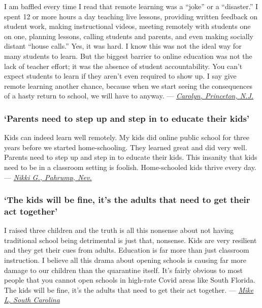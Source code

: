 I am baffled every time I read that remote learning was a ``joke'' or a
``disaster.'' I spent 12 or more hours a day teaching live lessons,
providing written feedback on student work, making instructional videos,
meeting remotely with students one on one, planning lessons, calling
students and parents, and even making socially distant ``house calls.''
Yes, it was hard. I know this was not the ideal way for many students to
learn. But the biggest barrier to online education was not the lack of
teacher effort; it was the absence of student accountability. You can't
expect students to learn if they aren't even required to show up. I say
give remote learning another chance, because when we start seeing the
consequences of a hasty return to school, we will have to anyway. ---
\href{https://nyti.ms/2DLfVjo\#permid=108078115}{\emph{Carolyn,
Princeton, N.J.}}

\hypertarget{parents-need-to-step-up-and-step-in-to-educate-their-kids}{%
\subsubsection{\texorpdfstring{\textbf{`Parents need to step up and step
in to educate their
kids'}}{`Parents need to step up and step in to educate their kids'}}\label{parents-need-to-step-up-and-step-in-to-educate-their-kids}}

Kids can indeed learn well remotely. My kids did online public school
for three years before we started home-schooling. They learned great and
did very well. Parents need to step up and step in to educate their
kids. This insanity that kids need to be in a classroom setting is
foolish. Home-schooled kids thrive every day. ---
\href{https://nyti.ms/30w0Yti\#permid=108204069}{\emph{Nikki G.,
Pahrump, Nev.}}

\hypertarget{the-kids-will-be-fine-its-the-adults-that-need-to-get-their-act-together}{%
\subsubsection{\texorpdfstring{\textbf{`The kids will be fine, it's the
adults that need to get their act
together'}}{`The kids will be fine, it's the adults that need to get their act together'}}\label{the-kids-will-be-fine-its-the-adults-that-need-to-get-their-act-together}}

I raised three children and the truth is all this nonsense about not
having traditional school being detrimental is just that, nonsense. Kids
are very resilient and they get their cues from adults. Education is far
more than just classroom instruction. I believe all this drama about
opening schools is causing far more damage to our children than the
quarantine itself. It's fairly obvious to most people that you cannot
open schools in high-rate Covid areas like South Florida. The kids will
be fine, it's the adults that need to get their act together. ---
\href{https://nyti.ms/2OQMFKd\#permid=108282017}{\emph{Mike L, South
Carolina}}


